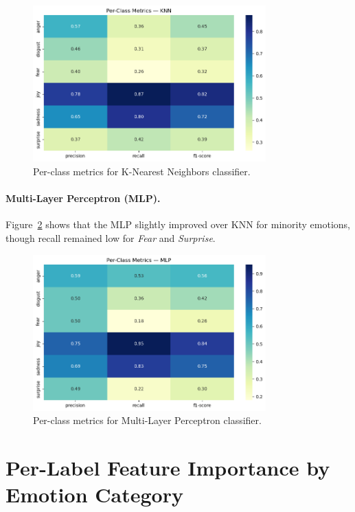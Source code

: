 \documentclass{article}
\begin{document}
\begin{figure}[H]
\centering
\includegraphics[width=0.8\textwidth]{Graphics/per_class_score/per_class_knn.png}
\caption{Per-class metrics for K-Nearest Neighbors classifier.}
\label{fig:per_class_knn}
\end{figure}

\paragraph{Multi-Layer Perceptron (MLP).}
Figure~\ref{fig:per_class_mlp} shows that the MLP slightly improved over KNN for minority emotions, though recall remained low for \textit{Fear} and \textit{Surprise}.

\begin{figure}[H]
\centering
\includegraphics[width=0.8\textwidth]{Graphics/per_class_score/per_class_mlp.png}
\caption{Per-class metrics for Multi-Layer Perceptron classifier.}
\label{fig:per_class_mlp}
\end{figure}

\FloatBarrier

\newpage

\section{Per-Label Feature Importance by Emotion Category}
\label{appendix:perlabel_importance}
\end{document}
